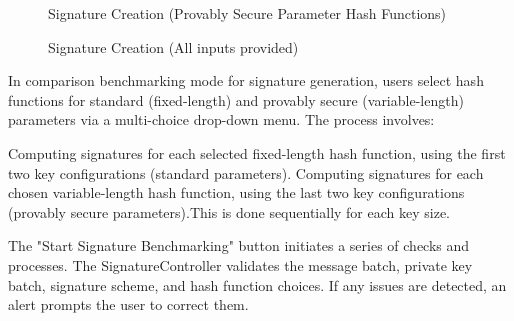 \documentclass[]{final_report}
\theoremstyle{definition}
\begin{document}
\begin{figure}[H]
\begin{minipage}{0.49\textwidth}
        \caption{Signature Creation (Provably Secure Parameter Hash Functions)}
        \label{fig:image2}
    \end{minipage}
      \begin{minipage}{0.55\textwidth}
        \centering
        \caption{Signature Creation (All inputs provided)}
        \label{fig:image2}
    \end{minipage}
\end{figure}

In comparison benchmarking mode for signature generation, users select hash functions for standard (fixed-length) and provably secure (variable-length) parameters via a multi-choice drop-down menu. The process involves:

Computing signatures for each selected fixed-length hash function, using the first two key configurations (standard parameters).
Computing signatures for each chosen variable-length hash function, using the last two key configurations (provably secure parameters).This is done sequentially for each key size.

The "Start Signature Benchmarking" button initiates a series of checks and processes. The SignatureController validates the message batch, private key batch, signature scheme, and hash function choices. If any issues are detected, an alert prompts the user to correct them.
\end{document}
